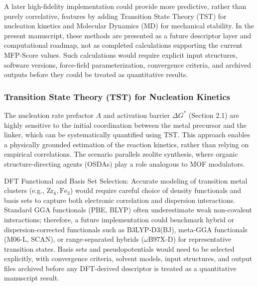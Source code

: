 \documentclass[12pt,a4paper]{article}
\begin{document}
A later high-fidelity implementation could provide more predictive, rather than purely correlative, features by adding Transition State Theory (TST) for nucleation kinetics and Molecular Dynamics (MD) for mechanical stability. In the present manuscript, these methods are presented as a future descriptor layer and computational roadmap, not as completed calculations supporting the current MFP-Score values. Such calculations would require explicit input structures, software versions, force-field parameterization, convergence criteria, and archived outputs before they could be treated as quantitative results.

\subsubsection{Transition State Theory (TST) for Nucleation Kinetics}

The nucleation rate prefactor $A$ and activation barrier $\Delta G^*$ (Section 2.1) are highly sensitive to the initial coordination between the metal precursor and the linker, which can be systematically quantified using TST. This approach enables a physically grounded estimation of the reaction kinetics, rather than relying on empirical correlations. The scenario parallels zeolite synthesis, where organic structure-directing agents (OSDAs) play a role analogous to MOF modulators.\cite{ref15}

DFT Functional and Basis Set Selection:  
Accurate modeling of transition metal clusters (e.g., $\text{Zr}_6, \text{Fe}_3$) would require careful choice of density functionals and basis sets to capture both electronic correlation and dispersion interactions. Standard GGA functionals (PBE, BLYP) often underestimate weak non-covalent interactions; therefore, a future implementation could benchmark hybrid or dispersion-corrected functionals such as B3LYP-D3(BJ), meta-GGA functionals (M06-L, SCAN), or range-separated hybrids ($\omega\text{B97X-D}$) for representative transition states. Basis sets and pseudopotentials would need to be selected explicitly, with convergence criteria, solvent models, input structures, and output files archived before any DFT-derived descriptor is treated as a quantitative manuscript result.
\end{document}

